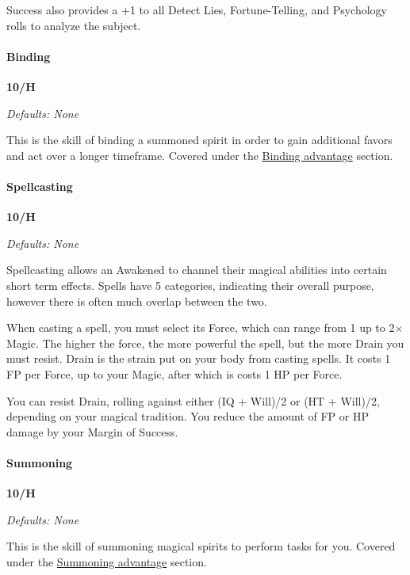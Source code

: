 \begin{multicols}{3}
	Success also provides a +1 to all Detect Lies, Fortune-Telling, and Psychology rolls to analyze the subject.
	
	\paragraph{Binding}
	\begin{flushright}
		\textbf{10/H}
	\end{flushright}
	\textcolor{NavyBlue}{\textit{Defaults: None}}
	
	This is the skill of binding a summoned spirit in order to gain additional favors and act over a longer timeframe. Covered under the \hyperref[binding]{Binding advantage} section.
	
	\paragraph{Spellcasting}\label{spellcasting_skill}
	\begin{flushright}
		\textbf{10/H}
	\end{flushright}
	\textcolor{NavyBlue}{\textit{Defaults: None}}
	
	Spellcasting allows an Awakened to channel their magical abilities into certain short term effects. Spells have 5 categories, indicating their overall purpose, however there is often much overlap between the two.
	
	When casting a spell, you must select its Force, which can range from 1 up to 2\(\times\)Magic. The higher the force, the more powerful the spell, but the more Drain you must resist. Drain is the strain put on your body from casting spells. It costs 1 FP per Force, up to your Magic, after which is costs 1 HP per Force. 
	
	You can resist Drain, rolling against either (IQ + Will)/2 or (HT + Will)/2, depending on your magical tradition. You reduce the amount of FP or HP damage by your Margin of Success.
	
	\paragraph{Summoning}
	\begin{flushright}
		\textbf{10/H}
	\end{flushright}
	\textcolor{NavyBlue}{\textit{Defaults: None}}
	
	This is the skill of summoning magical spirits to perform tasks for you. Covered under the \hyperref[summoning]{Summoning advantage} section.
	

\end{multicols}
